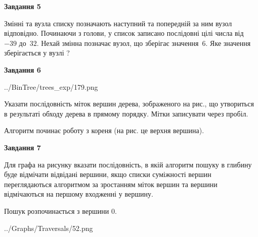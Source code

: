 \documentclass[12pt, ukrainian]{article}
\begin{document}
{\begin {large}
{\begin {center}\textbf{Завдання 5}\end {center}}\par
Змінні  та  вузла списку позначають наступний та попередній за ним вузол відповідно. Починаючи з голови, у список записано послідовні цілі числа від~$-39$ до~$32$. Нехай змінна  позначає вузол, що зберігає значення~$6$.
Яке значення зберігається у вузлі  ?\par
\newpage

{\begin {center}\textbf{Завдання 6}\end {center}}\par

\begin{center}
	{../BinTree/trees_exp/179.png}
\end{center}
Указати послідовність міток вершин дерева, зображеного на рис., що утвориться в результаті обходу дерева в прямому порядку. Мітки записувати через пробіл.\par Алгоритм починає роботу з кореня (на рис. це верхня вершина).\par
\newpage

{\begin {center}\textbf{Завдання 7}\end {center}}\par
Для графа на рисунку вказати послідовність, в якій алгоритм пошуку в глибину буде відмічати відвідані вершини, якщо списки суміжності вершин переглядаються алгоритмом за зростанням міток вершин та вершини відмічаються на першому вход\-женні у вершину.\par
Пошук розпочинається з вершини 0.\par

\begin{center}
	{../Graphs/Traversals/52.png}
\end{center}\par
\newpage


\end{large}}
\end{document}
